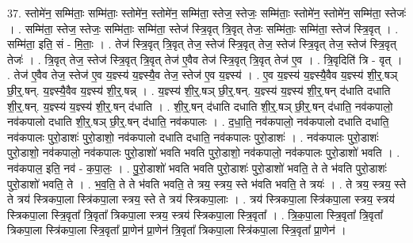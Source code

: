 \documentclass[17pt]{extarticle}
\begin{document}
37. स्तोमे॑न॒ सम्मि॑ताः॒ सम्मि॑ताः॒ स्तोमे॑न॒ स्तोमे॑न॒ सम्मि॑ता॒ स्तेज॒ स्तेजः॒ सम्मि॑ताः॒ स्तोमे॑न॒ स्तोमे॑न॒ सम्मि॑ता॒ स्तेजः॑ । . सम्मि॑ता॒ स्तेज॒ स्तेजः॒ सम्मि॑ताः॒ सम्मि॑ता॒ स्तेज॑ स्त्रि॒वृत् त्रि॒वृत् तेजः॒ सम्मि॑ताः॒ सम्मि॑ता॒ स्तेज॑ स्त्रि॒वृत् । . सम्मि॑ता॒ इति॒ सं - मि॒ताः॒ । . तेज॑ स्त्रि॒वृत् त्रि॒वृत् तेज॒ स्तेज॑ स्त्रि॒वृत् तेज॒ स्तेज॑ स्त्रि॒वृत् तेज॒ स्तेज॑ स्त्रि॒वृत् तेजः॑ । . त्रि॒वृत् तेज॒ स्तेज॑ स्त्रि॒वृत् त्रि॒वृत् तेज॑ ए॒वैव तेज॑ स्त्रि॒वृत् त्रि॒वृत् तेज॑ ए॒व । . त्रि॒वृदिति॑ त्रि - वृत् । . तेज॑ ए॒वैव तेज॒ स्तेज॑ ए॒व य॒ज्ञ्स्य॑ य॒ज्ञ्स्यै॒व तेज॒ स्तेज॑ ए॒व य॒ज्ञ्स्य॑ । . ए॒व य॒ज्ञ्स्य॑ य॒ज्ञ्स्यै॒वैव य॒ज्ञ्स्य॑ शी॒र्॒.षञ् छी॒र्॒.षन्. य॒ज्ञ्स्यै॒वैव य॒ज्ञ्स्य॑ शी॒र्॒.षन्न् । . य॒ज्ञ्स्य॑ शी॒र्॒.षञ् छी॒र्॒.षन्. य॒ज्ञ्स्य॑ य॒ज्ञ्स्य॑ शी॒र्॒.षन् द॑धाति दधाति शी॒र्॒.षन्. य॒ज्ञ्स्य॑ य॒ज्ञ्स्य॑ शी॒र्॒.षन् द॑धाति । . शी॒र्॒.षन् द॑धाति दधाति शी॒र्॒.षञ् छी॒र्॒.षन् द॑धाति॒ नव॑कपालो॒ नव॑कपालो दधाति शी॒र्॒.षञ् छी॒र्॒.षन् द॑धाति॒ नव॑कपालः । . द॒धा॒ति॒ नव॑कपालो॒ नव॑कपालो दधाति दधाति॒ नव॑कपालः पुरो॒डाशः॑ पुरो॒डाशो॒ नव॑कपालो दधाति दधाति॒ नव॑कपालः पुरो॒डाशः॑ । . नव॑कपालः पुरो॒डाशः॑ पुरो॒डाशो॒ नव॑कपालो॒ नव॑कपालः पुरो॒डाशो॑ भवति भवति पुरो॒डाशो॒ नव॑कपालो॒ नव॑कपालः पुरो॒डाशो॑ भवति । . नव॑कपाल॒ इति॒ नव॑ - क॒पा॒लः॒ । . पु॒रो॒डाशो॑ भवति भवति पुरो॒डाशः॑ पुरो॒डाशो॑ भवति॒ ते ते भ॑वति पुरो॒डाशः॑ पुरो॒डाशो॑ भवति॒ ते । . भ॒व॒ति॒ ते ते भ॑वति भवति॒ ते त्रय॒ स्त्रय॒ स्ते भ॑वति भवति॒ ते त्रयः॑ । . ते त्रय॒ स्त्रय॒ स्ते ते त्रय॑ स्त्रिकपा॒ला स्त्रि॑कपा॒ला स्त्रय॒ स्ते ते त्रय॑ स्त्रिकपा॒लाः । . त्रय॑ स्त्रिकपा॒ला स्त्रि॑कपा॒ला स्त्रय॒ स्त्रय॑ स्त्रिकपा॒ला स्त्रि॒वृता᳚ त्रि॒वृता᳚ त्रिकपा॒ला स्त्रय॒ स्त्रय॑ स्त्रिकपा॒ला स्त्रि॒वृता᳚ । . त्रि॒क॒पा॒ला स्त्रि॒वृता᳚ त्रि॒वृता᳚ त्रिकपा॒ला स्त्रि॑कपा॒ला स्त्रि॒वृता᳚ प्रा॒णेन॑ प्रा॒णेन॑ त्रि॒वृता᳚ त्रिकपा॒ला स्त्रि॑कपा॒ला स्त्रि॒वृता᳚ प्रा॒णेन॑ । \newline
\end{document}
